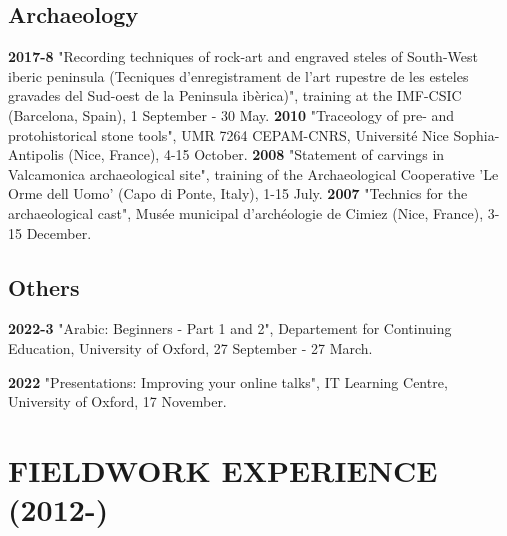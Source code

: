 \documentclass{article}
\begin{document}
\subsection*{Archaeology}

\textbf{2017-8 } "Recording techniques of rock-art and engraved steles of South-West iberic peninsula (Tecniques d'enregistrament de l'art rupestre de les esteles gravades del Sud-oest de la Peninsula ibèrica)", training at the IMF-CSIC (Barcelona, Spain), 1 September - 30 May.
\smallbreak
\textbf{2010 } "Traceology of pre- and protohistorical stone tools", UMR 7264 CEPAM-CNRS, Universit\'{e} Nice Sophia-Antipolis (Nice, France), 4-15 October.
\smallbreak
\textbf{2008 } "Statement of carvings in Valcamonica archaeological site", training of the Archaeological Cooperative 'Le Orme dell Uomo' (Capo di Ponte, Italy), 1-15 July.
\smallbreak
\textbf{2007 } "Technics for the archaeological cast", Mus\'{e}e municipal d'arch\'{e}ologie de Cimiez (Nice, France), 3-15 December.

\subsection*{Others}

\textbf{2022-3 }"Arabic: Beginners - Part 1 and 2", Departement for Continuing Education, University of Oxford, 27 September - 27 March.
\smallbreak

\textbf{2022 }"Presentations: Improving your online talks", IT Learning Centre, University of Oxford, 17 November.
\smallbreak

\section{FIELDWORK EXPERIENCE (2012-)}
\end{document}
